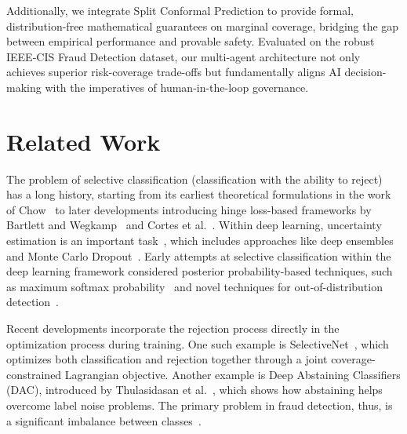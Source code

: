 \documentclass[12pt,a4paper]{article}
\begin{document}
Additionally, we integrate Split Conformal Prediction to provide formal,
distribution-free mathematical guarantees on marginal coverage, bridging the
gap between empirical performance and provable safety. Evaluated on the robust
IEEE-CIS Fraud Detection dataset, our multi-agent architecture not only achieves
superior risk-coverage trade-offs but fundamentally aligns AI decision-making
with the imperatives of human-in-the-loop governance.

\section{Related Work}
\label{sec:related_work}

The problem of selective classification (classification with the ability to
reject) has a long history, starting from its earliest theoretical formulations
in the work of Chow~\cite{b2} to later developments introducing hinge
loss-based frameworks by Bartlett and Wegkamp~\cite{b3} and Cortes et
al.~\cite{b4}. Within deep learning, uncertainty estimation is an important
task~\cite{b5}, which includes approaches like deep ensembles~\cite{b6} and
Monte Carlo Dropout~\cite{b7}. Early attempts at selective classification within
the deep learning framework considered posterior probability-based techniques,
such as maximum softmax probability~\cite{b8} and novel techniques for
out-of-distribution detection~\cite{b9}.

Recent developments incorporate the rejection process directly in the
optimization process during training. One such example is
SelectiveNet~\cite{b10,b11}, which optimizes both classification and rejection
together through a joint coverage-constrained Lagrangian objective. Another example is
Deep Abstaining Classifiers (DAC), introduced by Thulasidasan et al.~\cite{b1},
which shows how abstaining helps overcome label noise problems. The primary
problem in fraud detection, thus, is a significant imbalance between
classes~\cite{b12}.
\end{document}
